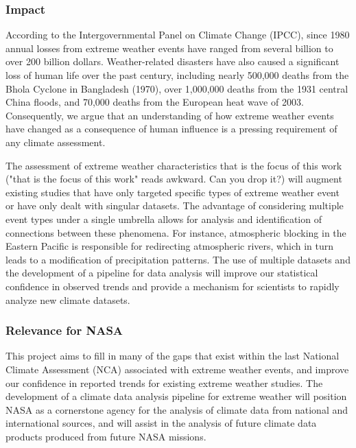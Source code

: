 \documentclass[11pt]{article}
\begin{document}
\subsubsection{Impact}

According to the Intergovernmental Panel on Climate Change (IPCC), since 1980 annual losses from extreme weather events have ranged from several billion to over 200 billion {\color{blue}dollars}.  Weather-related disasters have also caused a significant loss of human life over the past century, including nearly 500,000 deaths from the Bhola Cyclone in Bangladesh (1970), over 1,000,000 deaths from the 1931 central China floods, and 70,000 deaths from the European heat wave of 2003.  Consequently, we argue that an understanding of how extreme weather events have changed as a consequence of human influence is a pressing requirement of any climate assessment.

The assessment {\color{blue}of} extreme weather characteristics that is the focus of this work {\color{blue}("that is the focus of this work" reads awkward. Can you drop it?)} will augment existing studies that have only targeted specific types of extreme weather event or have only dealt with singular datasets.  The advantage of considering multiple event types under a single umbrella allows for analysis and identification of connections between these phenomena.  For instance, atmospheric blocking in the Eastern Pacific is responsible for redirecting atmospheric rivers, which in turn leads to a modification of precipitation patterns.  The use of multiple datasets and the development of a pipeline for data analysis will improve our statistical confidence in observed trends and provide a mechanism for scientists to rapidly analyze new climate datasets.

\subsubsection{Relevance for NASA}

This project aims to fill in many of the gaps that exist within the last National Climate Assessment (NCA) associated with extreme weather events, and improve our confidence in reported trends for existing extreme weather studies.  The development of a climate data analysis pipeline for extreme weather will position NASA as a cornerstone agency for the analysis of climate data from national and international sources, and will assist in the analysis of future climate data products produced from future NASA missions.
\end{document}
